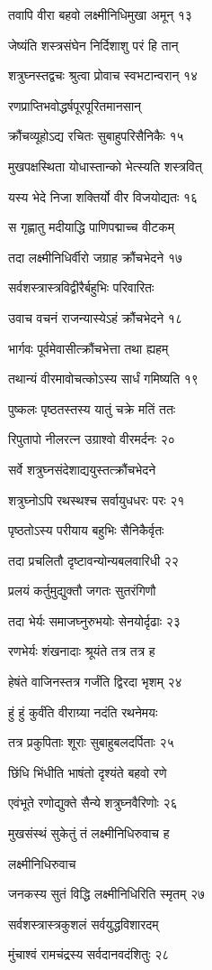 तवापि वीरा बहवो लक्ष्मीनिधिमुखा अमून् १३

जेष्यंति शस्त्रसंघेन निर्दिशाशु परं हि तान्

शत्रुघ्नस्तद्वचः श्रुत्वा प्रोवाच स्वभटान्वरान् १४

रणप्राप्तिभवोद्धर्षपूरपूरितमानसान्

क्रौंचव्यूहोऽद्य रचितः सुबाहुपरिसैनिकैः १५

मुखपक्षस्थिता योधास्तान्को भेत्स्यति शस्त्रवित्

यस्य भेदे निजा शक्तिर्यो वीर विजयोद्यतः १६

स गृह्णातु मदीयाद्धि पाणिपद्माच्च वीटकम्

तदा लक्ष्मीनिधिर्वीरो जग्राह क्रौंचभेदने १७

सर्वशस्त्रास्त्रविद्वीरैर्बहुभिः परिवारितः

उवाच वचनं राजन्यास्येऽहं क्रौंचभेदने १८

भार्गवः पूर्वमेवासीत्क्रौंचभेत्ता तथा ह्यहम्

तथान्यं वीरमावोचत्कोऽस्य सार्धं गमिष्यति १९

पुष्कलः पृष्ठतस्तस्य यातुं चक्रे मतिं ततः

रिपुतापो नीलरत्न उग्राश्वो वीरमर्दनः २०

सर्वे शत्रुघ्नसंदेशाद्ययुस्तत्क्रौंचभेदने

शत्रुघ्नोऽपि रथस्थश्च सर्वायुधधरः परः २१

पृष्ठतोऽस्य परीयाय बहुभिः सैनिकैर्वृतः

तदा प्रचलितौ दृष्टावन्योन्यबलवारिधी २२

प्रलयं कर्तुमुद्युक्तौ जगतः सुतरंगिणौ

तदा भेर्यः समाजघ्नुरुभयोः सेनयोर्दृढाः २३

रणभेर्यः शंखनादाः श्रूयंते तत्र तत्र ह

हेषंते वाजिनस्तत्र गर्जंति द्विरदा भृशम् २४

हुं हुं कुर्वंति वीराग्र्या नदंति रथनेमयः

तत्र प्रकुपिताः शूराः सुबाहुबलदर्पिताः २५

छिंधि भिंधीति भाषंतो दृश्यंते बहवो रणे

एवंभूते रणोद्युक्ते सैन्ये शत्रुघ्नवैरिणोः २६

मुखसंस्थं सुकेतुं तं लक्ष्मीनिधिरुवाच ह

लक्ष्मीनिधिरुवाच

जनकस्य सुतं विद्धि लक्ष्मीनिधिरिति स्मृतम् २७

सर्वशस्त्रास्त्रकुशलं सर्वयुद्धविशारदम्

मुंचाश्वं रामचंद्रस्य सर्वदानवदंशितुः २८

